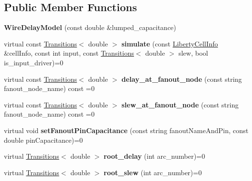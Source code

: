 \subsection*{Public Member Functions}
\begin{DoxyCompactItemize}
\item 
\hypertarget{classWireDelayModel_a0fd2defb581f6d8bcd67e5c935387d95}{{\bfseries Wire\-Delay\-Model} (const double \&lumped\-\_\-capacitance)}\label{classWireDelayModel_a0fd2defb581f6d8bcd67e5c935387d95}

\item 
\hypertarget{classWireDelayModel_a8375f713365be98c03672dbeb28eb930}{virtual const \hyperlink{classTransitions}{Transitions}$<$ double $>$ {\bfseries simulate} (const \hyperlink{structLibertyCellInfo}{Liberty\-Cell\-Info} \&cell\-Info, const int input, const \hyperlink{classTransitions}{Transitions}$<$ double $>$ slew, bool is\-\_\-input\-\_\-driver)=0}\label{classWireDelayModel_a8375f713365be98c03672dbeb28eb930}

\item 
\hypertarget{classWireDelayModel_a45a83dd192bcbf2a70ee13899256fe0d}{virtual const \hyperlink{classTransitions}{Transitions}$<$ double $>$ {\bfseries delay\-\_\-at\-\_\-fanout\-\_\-node} (const string fanout\-\_\-node\-\_\-name) const =0}\label{classWireDelayModel_a45a83dd192bcbf2a70ee13899256fe0d}

\item 
\hypertarget{classWireDelayModel_adaf486017e2ad91a900a9bef4e6f9340}{virtual const \hyperlink{classTransitions}{Transitions}$<$ double $>$ {\bfseries slew\-\_\-at\-\_\-fanout\-\_\-node} (const string fanout\-\_\-node\-\_\-name) const =0}\label{classWireDelayModel_adaf486017e2ad91a900a9bef4e6f9340}

\item 
\hypertarget{classWireDelayModel_a27d557bc1f2ed7e5e9787a8a5d82ecb2}{virtual void {\bfseries set\-Fanout\-Pin\-Capacitance} (const string fanout\-Name\-And\-Pin, const double pin\-Capacitance)=0}\label{classWireDelayModel_a27d557bc1f2ed7e5e9787a8a5d82ecb2}

\item 
\hypertarget{classWireDelayModel_a4f4ab93810af8ad90fd9fca0b06de141}{virtual \hyperlink{classTransitions}{Transitions}$<$ double $>$ {\bfseries root\-\_\-delay} (int arc\-\_\-number)=0}\label{classWireDelayModel_a4f4ab93810af8ad90fd9fca0b06de141}

\item 
\hypertarget{classWireDelayModel_a9e5344c26b73f549a2b5c38fea8af13d}{virtual \hyperlink{classTransitions}{Transitions}$<$ double $>$ {\bfseries root\-\_\-slew} (int arc\-\_\-number)=0}\label{classWireDelayModel_a9e5344c26b73f549a2b5c38fea8af13d}


\end{DoxyCompactItemize}
